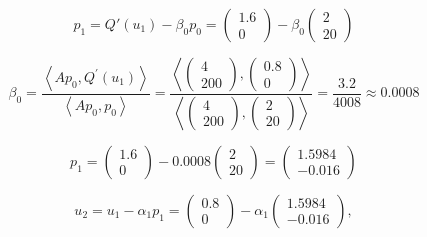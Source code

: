 \documentclass[12 pt]{article}
\begin{document}
$$p_1 = Q'(u_1) - \beta_0p_0 = \left(\begin{array}{c}
1.6 \\
0
\end{array}\right) - \beta_0 \left(\begin{array}{l}
2 \\
20
\end{array}\right)$$


$$\beta_0 = \frac{\left\langle Ap_0, Q^{\prime}\left(u_{1}\right)\right\rangle}{\left\langle A p_{0}, p_{0}\right\rangle}=\frac{\left\langle\left(\begin{array}{c}
	4 \\
	200
	\end{array}\right),\left(\begin{array}{c}
	0.8 \\
	0
	\end{array}\right)\right\rangle}{\left\langle\left(\begin{array}{c}
	4 \\
	200
	\end{array}\right),\left(\begin{array}{c}
	2 \\
	20
	\end{array}\right)\right\rangle}=\frac{3.2}{4008} \approx 0.0008 $$


$$ p_1 = \left(\begin{array}{c}
1.6 \\
0
\end{array}\right) - 0.0008 \left(\begin{array}{l}
2 \\
20
\end{array}\right) = 
\left(\begin{array}{l}
1.5984 \\
-0.016
\end{array}\right)$$


$$u_2=u_1-\alpha_1p_1 = \left(\begin{array}{c}
0.8 \\
0
\end{array}\right) - \alpha_1 \left(\begin{array}{l}
1.5984 \\
-0.016
\end{array}\right),$$
\end{document}
